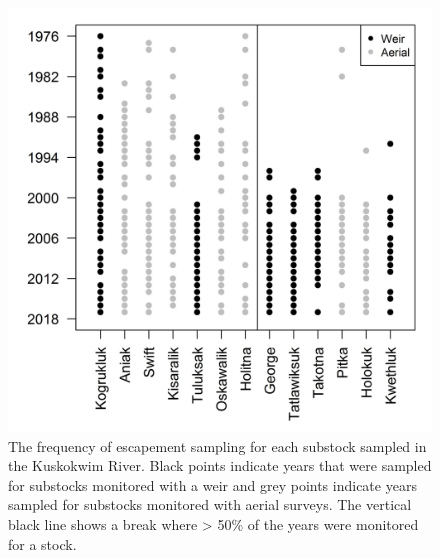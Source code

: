 \documentclass[12pt,]{book}
\theoremstyle{definition}
\theoremstyle{definition}
\theoremstyle{definition}
\theoremstyle{remark}
\begin{document}
\begin{figure}
  \centering
  \includegraphics{img/Ch4/obs-freq.jpg}
  \caption{The frequency of escapement sampling for each substock sampled in the Kuskokwim River. Black points indicate years that were sampled for substocks monitored with a weir and grey points indicate years sampled for substocks monitored with aerial surveys. The vertical black line shows a break where > 50\% of the years were monitored for a stock.}
  \label{fig:obs-freq}
\end{figure}

\clearpage
\end{document}
